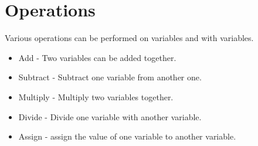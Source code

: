 \documentclass[12pt]{article}
\begin{document}
\section { Operations }
Various operations can be performed on variables and with variables.
\begin{itemize}
\item Add - Two variables can be added together.
\item Subtract - Subtract one variable from another one.
\item Multiply - Multiply two variables together.
\item Divide - Divide one variable with another variable.
\item Assign - assign the value of one variable to another variable.
\end{itemize}
\end{document}
